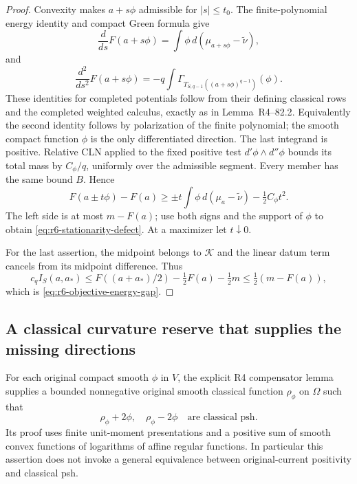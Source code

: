 \documentclass[11pt,a4paper]{article}
\numberwithin{equation}{section}
\theoremstyle{definition}
\theoremstyle{remark}
\begin{document}
\begin{proof}
Convexity makes $a+s\phi$ admissible for $|s|\le t_0$.
The finite-polynomial energy identity and compact Green formula give
\[
 \frac{d}{ds}F(a+s\phi)
                  =\int\phi\,d(\mu_{a+s\phi}-\widetilde\nu),
\]
and
\[
 \frac{d^2}{ds^2}F(a+s\phi)
       =-q\int \Gamma_{T_{S,q-1}((a+s\phi)^{q-1})}(\phi).
\]
These identities for completed potentials follow from their defining
classical rows and the completed weighted calculus, exactly as in
Lemma~\textup{R4--82.2}. Equivalently the second
identity follows by polarization of the finite polynomial; the smooth
compact function $\phi$ is the only differentiated direction.
The last integrand is positive. Relative CLN applied to the fixed
positive test $d'\phi\wedge d''\phi$ bounds its total mass by
$C_\phi/q$, uniformly over the admissible segment. Every member has
the same bound $B$. Hence
\[
 F(a\pm t\phi)-F(a)
    \ge\pm t\int\phi\,d(\mu_a-\widetilde\nu)
                                      -\tfrac12C_\phi t^2.
\]
The left side is at most $m-F(a)$; use both signs and the support of
$\phi$ to obtain \eqref{eq:r6-stationarity-defect}.
At a maximizer let $t\downarrow0$.

For the last assertion, the midpoint belongs to $\mathscr K$ and the
linear datum term cancels from its midpoint difference. Thus
\[
 c_q I_S(a,a_*)
 \le F((a+a_*)/2)-\tfrac12F(a)-\tfrac12m
 \le\tfrac12(m-F(a)),
\]
which is \eqref{eq:r6-objective-energy-gap}.
\end{proof}

\subsection{A classical curvature reserve that supplies the missing directions}

For each original compact smooth $\phi$ in $V$, the explicit R4
compensator lemma supplies a bounded nonnegative original smooth
classical function $\rho_\phi$ on $\Omega$ such that
\[
              \rho_\phi+2\phi,\quad \rho_\phi-2\phi
                           \quad\text{are classical psh}.
\]
Its proof uses finite unit-moment presentations and a positive sum of
smooth convex functions of logarithms of affine regular functions.
In particular this assertion does not invoke a general equivalence
between original-current positivity and classical psh.
\end{document}
